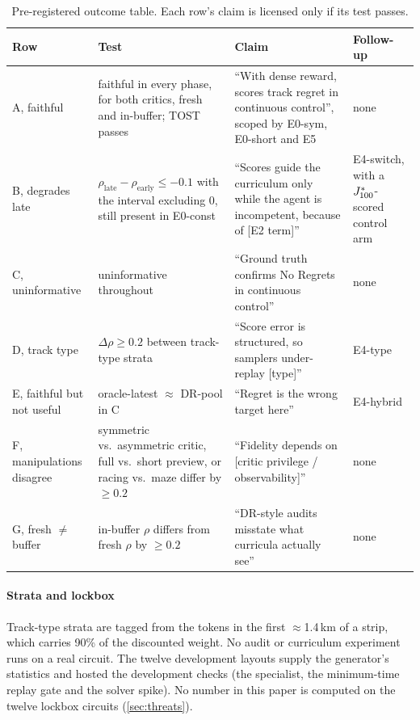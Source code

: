 \begin{table}[t]
\centering
\small
\caption{Pre-registered outcome table. Each row's claim is licensed only if its test
passes.}
\label{tab:outcomes}
\begin{tabularx}{\linewidth}{@{}>{\raggedright\arraybackslash}p{2.0cm}>{\raggedright\arraybackslash}X>{\raggedright\arraybackslash}X>{\raggedright\arraybackslash}p{2.3cm}@{}}
\toprule
Row & Test & Claim & Follow-up \\
\midrule
A, faithful & faithful in every phase, for both critics, fresh and in-buffer; TOST passes &
  ``With dense reward, scores track regret in continuous control'', scoped by E0-sym,
  E0-short and E5 & none \\
B, degrades late & $\rho_{\text{late}} - \rho_{\text{early}} \le -0.1$ with the interval
  excluding 0, still present in E0-const & ``Scores guide the curriculum only while the
  agent is incompetent, because of [E2 term]'' & E4-switch, with a $J^{*}_{100}$-scored control
  arm \\
C, uninformative & uninformative throughout & ``Ground truth confirms No Regrets in
  continuous control'' & none \\
D, track type & $\Delta\rho \ge 0.2$ between track-type strata & ``Score error is
  structured, so samplers under-replay [type]'' & E4-type \\
E, faithful but not useful & oracle-latest $\approx$ DR-pool in C & ``Regret is the wrong
  target here'' & E4-hybrid \\
F, manipulations disagree & symmetric vs.\ asymmetric critic, full vs.\ short preview, or
  racing vs.\ maze differ by $\ge 0.2$ & ``Fidelity depends on [critic privilege /
  observability]'' & none \\
G, fresh $\ne$ buffer & in-buffer $\rho$ differs from fresh $\rho$ by $\ge 0.2$ &
  ``DR-style audits misstate what curricula actually see'' & none \\
\bottomrule
\end{tabularx}
\end{table}

\paragraph{Strata and lockbox} Track-type strata are tagged from the tokens in the first
$\approx$1.4\,km of a strip, which carries 90\% of the discounted weight. No audit or
curriculum experiment runs on a real circuit. The twelve development layouts supply the
generator's statistics and hosted the development checks (the specialist, the
minimum-time replay gate and the solver spike). No number in this paper is computed on
the twelve lockbox circuits (\cref{sec:threats}).

